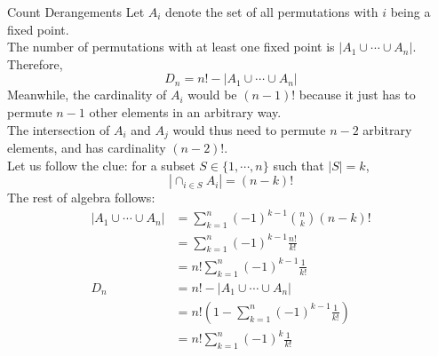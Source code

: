 \begin{ln-quest}{Count Derangements}{}
    Let $A_i$ denote the set of all permutations with $i$ being a fixed point. \\
    The number of permutations with at least one fixed point is $|A_1 \cup \cdots \cup A_n|$. Therefore,
    \[D_n = n! - |A_1 \cup \cdots \cup A_n|\]
    Meanwhile, the cardinality of $A_i$ would be $(n - 1)!$ because it just has to permute $n - 1$ other elements in an arbitrary way. \\
    The intersection of $A_i$ and $A_j$ would thus need to permute $n - 2$ arbitrary elements, and has cardinality $(n - 2)!$. \\
    Let us follow the clue: for a subset $S \in \{1, \cdots, n\}$ such that $|S| = k$,
    \[|\cap_{i \in S} A_i| = (n - k)!\]
    The rest of algebra follows:
    \begin{align*}
        |A_1 \cup \cdots \cup A_n|
        &= \sum_{k = 1}^n {(-1)}^{k - 1} \binom{n}{k} (n - k)! \\
        &= \sum_{k = 1}^n {(-1)}^{k - 1} \frac{n!}{k!} \\
        &= n! \sum_{k = 1}^n {(-1)}^{k - 1} \frac{1}{k!} \\
        D_n
        &= n! - |A_1 \cup \cdots \cup A_n| \\
        &= n! (1 - \sum_{k = 1}^n {(-1)}^{k - 1} \frac{1}{k!}) \\
        &= n! \sum_{k = 1}^n {(-1)}^{k} \frac{1}{k!}
    \end{align*}
\end{ln-quest}
